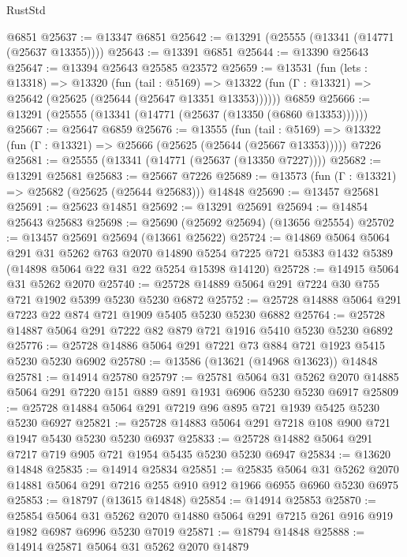 \begin{lexlean}{RustStd}
\begin{coremodule}
    @6851
@25637 := @13347 @6851
@25642 := @13291 (@25555 (@13341 (@14771 (@25637 @13355))))
@25643 := @13391 @6851
@25644 := @13390 @25643
@25647 := @13394 @25643 @25585 @23572
@25659 := @13531
    (fun (lets : @13318) =>
    @13320
      (fun (tail : @5169) =>
      @13322 (fun (Γ : @13321) => @25642 (@25625 (@25644 (@25647 @13351 @13353))))))
    @6859
@25666 := @13291 (@25555 (@13341 (@14771 (@25637 (@13350 (@6860 @13353))))))
@25667 := @25647 @6859
@25676 := @13555
    (fun (tail : @5169) => @13322 (fun (Γ : @13321) => @25666 (@25625 (@25644 (@25667 @13353)))))
    @7226
@25681 := @25555 (@13341 (@14771 (@25637 (@13350 @7227))))
@25682 := @13291 @25681
@25683 := @25667 @7226
@25689 := @13573 (fun (Γ : @13321) => @25682 (@25625 (@25644 @25683))) @14848
@25690 := @13457 @25681
@25691 := @25623 @14851
@25692 := @13291 @25691
@25694 := @14854 @25643 @25683
@25698 := @25690 (@25692 @25694) (@13656 @25554)
@25702 := @13457 @25691 @25694 (@13661 @25622)
@25724 := @14869
    @5064
    @5064
    @291
    @31
    @5262
    @763
    @2070
    @14890
    @5254
    @7225
    @721
    @5383
    @1432
    @5389
    (@14898 @5064 @22 @31 @22 @5254 @15398 @14120)
@25728 := @14915 @5064 @31 @5262 @2070
@25740 := @25728 @14889 @5064 @291 @7224 @30 @755 @721 @1902 @5399 @5230 @5230 @6872
@25752 := @25728 @14888 @5064 @291 @7223 @22 @874 @721 @1909 @5405 @5230 @5230 @6882
@25764 := @25728 @14887 @5064 @291 @7222 @82 @879 @721 @1916 @5410 @5230 @5230 @6892
@25776 := @25728 @14886 @5064 @291 @7221 @73 @884 @721 @1923 @5415 @5230 @5230 @6902
@25780 := @13586 (@13621 (@14968 @13623)) @14848
@25781 := @14914 @25780
@25797 := @25781
    @5064
    @31
    @5262
    @2070
    @14885
    @5064
    @291
    @7220
    @151
    @889
    @891
    @1931
    @6906
    @5230
    @5230
    @6917
@25809 := @25728 @14884 @5064 @291 @7219 @96 @895 @721 @1939 @5425 @5230 @5230 @6927
@25821 := @25728 @14883 @5064 @291 @7218 @108 @900 @721 @1947 @5430 @5230 @5230 @6937
@25833 := @25728 @14882 @5064 @291 @7217 @719 @905 @721 @1954 @5435 @5230 @5230 @6947
@25834 := @13620 @14848
@25835 := @14914 @25834
@25851 := @25835
    @5064
    @31
    @5262
    @2070
    @14881
    @5064
    @291
    @7216
    @255
    @910
    @912
    @1966
    @6955
    @6960
    @5230
    @6975
@25853 := @18797 (@13615 @14848)
@25854 := @14914 @25853
@25870 := @25854
    @5064
    @31
    @5262
    @2070
    @14880
    @5064
    @291
    @7215
    @261
    @916
    @919
    @1982
    @6987
    @6996
    @5230
    @7019
@25871 := @18794 @14848
@25888 := @14914
    @25871
    @5064
    @31
    @5262
    @2070
    @14879

\end{coremodule}
\end{lexlean}

